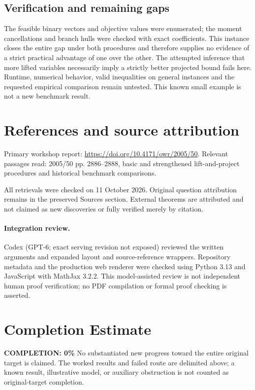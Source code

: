 \documentclass[11pt]{article}
\begin{document}
\subsection{Verification and remaining gaps}
The feasible binary vectors and objective values were enumerated; the moment cancellations and branch hulls were checked with exact coefficients. This instance closes the entire gap under both procedures and therefore supplies no evidence of a strict practical advantage of one over the other. The attempted inference that more lifted variables necessarily imply a strictly better projected bound fails here. Runtime, numerical behavior, valid inequalities on general instances and the requested empirical comparison remain untested. This known small example is not a new benchmark result.

\section{References and source attribution}
Primary workshop report: \url{https://doi.org/10.4171/owr/2005/50}. Relevant passages read: 2005/50 pp. 2886--2888, basic and strengthened lift-and-project procedures and historical benchmark comparisons.

All retrievals were checked on 11 October 2026. Original question attribution remains in the preserved Sources section. External theorems are attributed and not claimed as new discoveries or fully verified merely by citation.


\paragraph{Integration review.} Codex (GPT-6; exact serving revision not exposed) reviewed the written arguments and expanded layout and source-reference wrappers. Repository metadata and the production web renderer were checked using Python 3.13 and JavaScript with MathJax 3.2.2. This model-assisted review is not independent human proof verification; no PDF compilation or formal proof checking is asserted.

\section{Completion Estimate}
\noindent\textbf{COMPLETION: 0\%}
No substantiated new progress toward the entire original target is claimed. The worked results and failed route are delimited above; a known result, illustrative model, or auxiliary obstruction is not counted as original-target completion.
\end{document}
